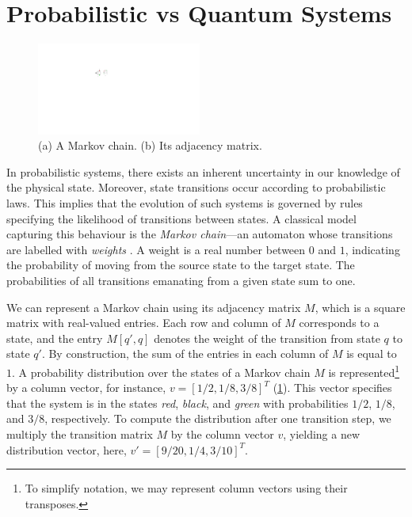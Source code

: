 \section{Probabilistic vs Quantum Systems}

\begin{figure}
\includegraphics[width=0.48\textwidth]{Figures/MChains/Mchain} 
\caption{(a) A Markov chain. (b) Its adjacency matrix.}
\label{MChain:fig}
\end{figure}

In probabilistic systems, there exists an inherent uncertainty in our knowledge of the physical state.  
%
Moreover, state transitions occur according to probabilistic laws.  
%
This implies that the evolution of such systems is governed by rules specifying the likelihood of transitions between states.  
%
A classical model capturing this behaviour is the \emph{Markov chain}—an automaton whose transitions are labelled with \emph{weights} \cite{DBLP:books/daglib/0020348,DBLP:conf/fossacs/PiribauerB19}.
%
A weight is a real number between $0$ and $1$, indicating the probability of moving from the source state to the target state.  
%
The probabilities of all transitions emanating from a given state sum to one.  

We can represent a Markov chain using its adjacency matrix $M$, which is a square matrix with real-valued entries.  
%
Each row and column of $M$ corresponds to a state, and the entry $M[q', q]$ denotes the weight of the transition from state $q$ to state $q'$.  
%
By construction, the sum of the entries in each column of $M$ is equal to $1$.
%
A probability distribution over the states of a Markov chain $M$ is represented\footnote{To simplify notation, we may represent column vectors using their transposes.}  
 by a column vector, for instance, $v = [1/2, 1/8, 3/8]^T$ (\cref{MChain:fig}).
%
%
This vector specifies that the system is in the states \emph{red}, \emph{black}, and \emph{green} with probabilities $1/2$, $1/8$, and $3/8$, respectively.  
%
To compute the distribution after one transition step, we multiply the transition matrix $M$ by the column vector $v$, yielding a new distribution vector, here, $v' = [9/20, 1/4, 3/10]^T$.


